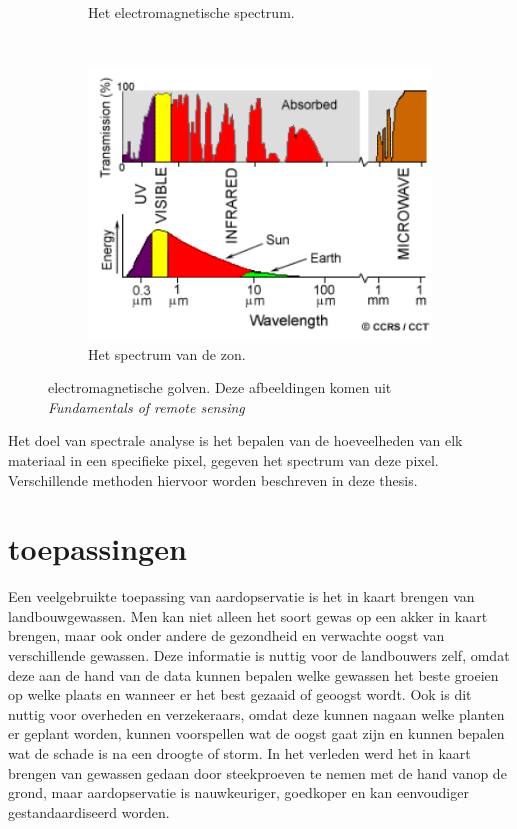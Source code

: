 \documentclass[12pt]{report}
\newcommand{\rulesep}{\unskip\ \vrule height -1ex\ }
\begin{document}
\begin{figure}
\begin{subfigure}[b]{0.2\textwidth}
\caption{Het electromagnetische spectrum. \label{fig:spec}}
\end{subfigure}\rulesep
\begin{subfigure}[b]{0.4\textwidth}
\includegraphics[width=\textwidth]{spec2.PNG}
\caption{Het spectrum van de zon. \label{fig:specs}}
\end{subfigure}
\caption{electromagnetische golven. Deze afbeeldingen komen uit \textit{Fundamentals of remote sensing\cite{fun}}}
\end{figure}


Het doel van spectrale analyse is het bepalen van de hoeveelheden van elk materiaal in een specifieke pixel, gegeven het spectrum van deze pixel. Verschillende methoden hiervoor worden beschreven in deze thesis. 


\section{toepassingen}


Een veelgebruikte toepassing van aardopservatie is het in kaart brengen van landbouwgewassen\cite{fun}. Men kan niet alleen het soort gewas op een akker in kaart brengen, maar ook onder andere de gezondheid en verwachte oogst van verschillende gewassen. Deze informatie is nuttig voor de landbouwers zelf, omdat deze aan de hand van de data kunnen bepalen welke gewassen het beste groeien op welke plaats en wanneer er het best gezaaid of geoogst wordt. Ook is dit nuttig voor overheden en verzekeraars, omdat deze kunnen nagaan welke planten er geplant worden, kunnen voorspellen wat de oogst gaat zijn en kunnen bepalen wat de schade is na een droogte of storm. In het verleden werd het in kaart brengen van gewassen gedaan door steekproeven te nemen met de hand vanop de grond, maar aardopservatie is nauwkeuriger, goedkoper en kan eenvoudiger gestandaardiseerd worden. 
\end{document}
